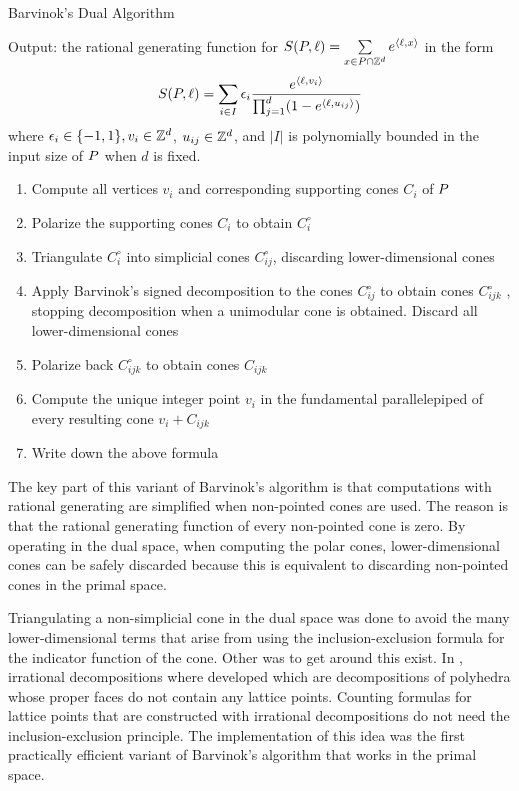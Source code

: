 \begin{algorithm}
\caption{Barvinok's Dual Algorithm}
\label{alg:barvinok-dual}
\begin{justify}
Output: the rational generating function for $S({ P}, \ell) = \sum\limits_{x \in { P} \cap {\mathbb Z}^d} e^{\langle \ell, x \rangle}$ in the form
\[S({ P},\ell) = \sum_{i \in I} \epsilon_i \frac{e^{\langle \ell, v_i \rangle}}{\prod_{j=1}^d ( 1 - e^{\langle \ell, u_{ij}\rangle})}\] 
where $\epsilon_i \in \{-1,1\}, v_i \in {\mathbb Z}^d$, $u_{ij} \in {\mathbb Z}^d$, and $|I|$ is polynomially bounded in the input size of ${ P}$ when $d$ is fixed.
\end{justify}
\begin{enumerate}
\item  Compute all vertices $v_i$ and corresponding supporting cones $C_i$ of ${ P}$
\item Polarize the supporting cones $C_i$ to obtain $C_i^\circ$
\item Triangulate $C_i^\circ$ into simplicial cones $C_{ij}^\circ$, discarding lower-dimensional cones
\item Apply Barvinok’s signed decomposition to the cones $C_{ij}^\circ$ to obtain cones $C_{ijk}^\circ$
, stopping decomposition when a unimodular cone is obtained. Discard all lower-dimensional cones
\item Polarize back $C_{ijk}^\circ$ to obtain cones $C_{ijk}$
\item Compute the unique integer point $v_i$ in the fundamental parallelepiped of every resulting cone $v_i+C_{ijk}$
\item Write down the above formula
\end{enumerate}
\end{algorithm}

The key part of this variant of Barvinok's algorithm is that computations with rational generating are simplified when non-pointed cones are used. The reason is that the rational generating
function of every non-pointed cone is zero. By operating in the dual space, when computing the polar cones, lower-dimensional cones can be safely discarded because this is equivalent to discarding non-pointed cones in the primal space. 

Triangulating a non-simplicial cone in the dual space was done to avoid the many lower-dimensional terms that arise from using the inclusion-exclusion formula for the indicator function of the cone. Other was to get around this exist. In \cite{koeppe:irrational-barvinok, beck-sottile:irrational, beck-haase-sottile:theorema}, irrational decompositions where developed which are decompositions of polyhedra whose proper faces do not contain any lattice points. Counting formulas for lattice points that are constructed with irrational decompositions do not need the inclusion-exclusion principle. The implementation of this idea \cite{latte-macchiato} was the first practically efficient variant of Barvinok’s algorithm that works in the primal space.


